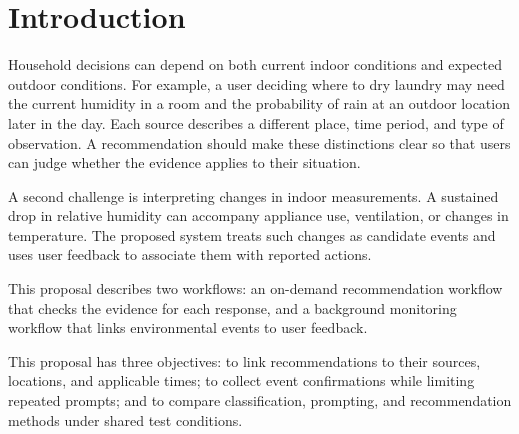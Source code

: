 \section{Introduction}
Household decisions can depend on both current indoor conditions and expected outdoor conditions. For example, a user deciding where to dry laundry may need the current humidity in a room and the probability of rain at an outdoor location later in the day. Each source describes a different place, time period, and type of observation. A recommendation should make these distinctions clear so that users can judge whether the evidence applies to their situation.

A second challenge is interpreting changes in indoor measurements. A sustained drop in relative humidity can accompany appliance use, ventilation, or changes in temperature. The proposed system treats such changes as candidate events and uses user feedback to associate them with reported actions.

This proposal describes two workflows: an on-demand recommendation workflow that checks the evidence for each response, and a background monitoring workflow that links environmental events to user feedback.

This proposal has three objectives: to link recommendations to their sources, locations, and applicable times; to collect event confirmations while limiting repeated prompts; and to compare classification, prompting, and recommendation methods under shared test conditions.

